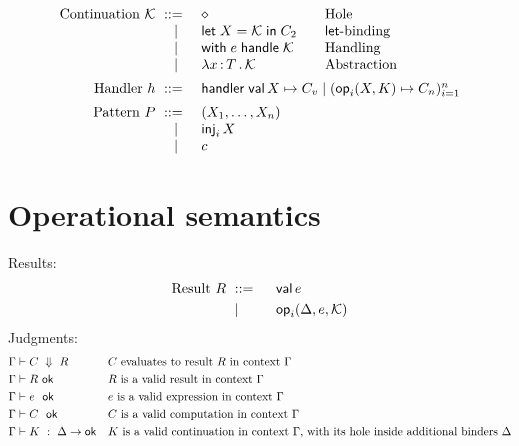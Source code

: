 \documentclass{article}
\newcommand{\C}{C}     %
\newcommand{\K}{K}     %
\newcommand{\X}{X}     %
\newcommand{\rgn}{r}   %
\newcommand{\h}{h}     %
\newcommand{\KK}{{\cal K}} %
\newcommand{\val}{\mathsf{val}\,} %
\newcommand{\letin}[1]{\mathsf{let}\; #1 \;\mathsf{in}\;} %
\newcommand{\opPat}[3][i]{\mathsf{op}_{#1}(#2, #3)} %
\newcommand{\opRes}[4][i]{\mathsf{op}_{#1}(#2, #3, #4)} %
\newcommand{\withhandle}[1]{\mathsf{with}\;#1\;\mathsf{handle}\;} %
\newcommand{\abs}[1]{\mathsf{abs}\;#1\;\mathsf{in}\;} %
\newcommand{\ttlam}[2]{\lambda #1 \,{:}\, #2 \,.\,} %
\newcommand{\handler}[6][n]{\mathsf{handler}\; \val #2 \mapsto #3 \mid (\opPat{#4}{#5} \mapsto #6_{#1})_{i=1}^{#1}}
\newcommand{\hole}{\diamond}
\newcommand{\tuple}[1]{(#1)}
\newcommand{\pat}{P}
\renewcommand{\c}{c} %
\newcommand{\inj}[2][i]{\mathsf{inj}_{#1}\, #2}
\newcommand{\evalto}[3][\G]{#1 \vdash #2 \ \Downarrow\  #3}
\newcommand{\resultok}[2][\G]{#1 \vdash #2 \ \mathsf{ok}}
\newcommand{\eok}[2][\G]{#1 \vdash #2 \ \ \mathsf{ok}}
\newcommand{\cok}[2][\G]{#1 \vdash #2 \ \ \mathsf{ok}}
\newcommand{\kok}[3][\G]{#1 \vdash #3 \ : \ #2\to\mathsf{ok}}
\newcommand{\typicalhandler}{\handler{\X}{\C_v}{\X}{\K}{\C}}
\begin{document}
\begin{equation*}
\begin{array}{rl@{\qquad}l}
    \text{Continuation $\KK$} \bnf    & \hole                & \text{Hole} \\
    \bnfor  & \letin{\X = \KK} \C_2  & \text{$\mathsf{let}$-binding} \\
    \bnfor  & \withhandle{\e} \KK & \text{Handling} \\
    \bnfor  & \ttlam{\x}{\T}{\KK} & \text{Abstraction} \\[5pt]

  \text{Handler $\h$}
  \bnf & \multicolumn{2}{l}{\typicalhandler}\\[5pt]

  \text{Pattern $\pat$}
  \bnf & \tuple{\X_1,\ldots,\X_n}\\
  \bnfor & \inj{\X}\\
  \bnfor & \c\\
\end{array}
\end{equation*}



\section{Operational semantics}
\label{sec:oper-semant}

Results:
%
\begin{equation*}
  \text{Result $R$}
  \begin{aligned}[t]
    &\bnf   {} && \val \e \\
    &\bnfor {} && \opRes{\D}{\e}{\KK} \\
  \end{aligned}
\end{equation*}
%
Judgments:
%
\begin{align*}
  &\evalto[\G]{C}{R} &&\text{$C$ evaluates to result $R$ in context $\G$} \\
  &\resultok[\G]{R}  &&\text{$R$ is a valid result in context $\G$} \\
  &\eok[\G]{\e} &&\text{$\e$ is a valid expression in context $\G$} \\
  &\cok[\G]{\C} &&\text{$\C$ is a valid computation in context $\G$} \\
  &\kok[\G]{\D}{\K} &&\text{$\K$ is a valid continuation in context $\G$,
                              with its hole inside additional binders $\D$} \\
\end{align*}
%
\end{document}
